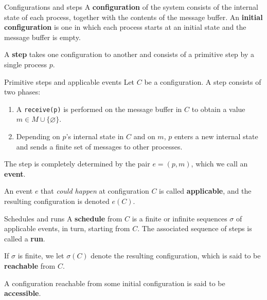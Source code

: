 \documentclass[12pt]{beamer}
\begin{document}
  \begin{frame}{Configurations and steps}
    A \textbf{configuration} of the system consists of the internal state of each process, together with the contents of the message buffer. An \textbf{initial configuration} is one in which each process starts at an initial state and the message buffer is empty.

    \vspace{0.5cm}

    A \textbf{step} takes one configuration to another and consists of a primitive step by a single process \(p\).
  \end{frame}

  \begin{frame}{Primitive steps and applicable events}
    Let \(C\) be a configuration. A step consists of two phases:
    \begin{enumerate}
      \item A \texttt{receive(p)} is performed on the message buffer in \(C\) to obtain a value \(m\in M\cup\{\varnothing\}\).
      \item Depending on \(p\)'s internal state in \(C\) and on \(m\), \(p\) enters a new internal state and sends a finite set of messages to other processes.
    \end{enumerate}

    \vspace{0.25cm}

    The step is completely determined by the pair \(e = (p,m)\), which we call an \textbf{event}.

    \vspace{0.25cm}

    An event \(e\) that \emph{could happen} at configuration \(C\) is called \textbf{applicable}, and the resulting configuration is denoted \(e(C)\).
  \end{frame}

  \begin{frame}{Schedules and runs}
    A \textbf{schedule} from \(C\) is a finite or infinite sequences \(\sigma\) of applicable events, in turn, starting from \(C\). The associated sequence of steps is called a \textbf{run}.

    \vspace{0.25cm}

    If \(\sigma\) is finite, we let \(\sigma(C)\) denote the resulting configuration, which is said to be \textbf{reachable} from \(C\).

    \vspace{0.25cm}

    A configuration reachable from some initial configuration is said to be \textbf{accessible}.
  \end{frame}
\end{document}

